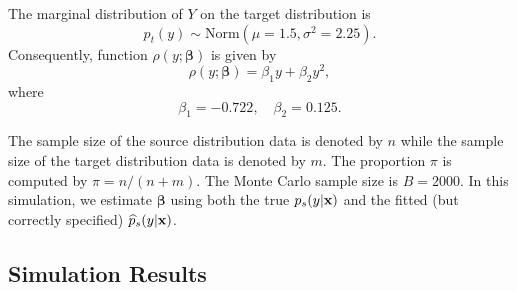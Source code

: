 \documentclass[12pt]{article}
\def\x{{\bf x}}
\def\bb{{\boldsymbol\beta}}
\begin{document}
The marginal distribution of $Y$ on the target distribution is
\[
p_t(y)\sim\mathrm{Norm}(\mu=1.5, \sigma^2=2.25).
\]
Consequently, function $\rho(y;\bb)$ is given by
\[
\rho(y;\bb)=\beta_1y+\beta_2y^2,
\]
where
\[
\beta_1=-0.722,\quad\beta_2=0.125.
\]

The sample size of the source distribution data is denoted by $n$ while the sample size of the target distribution data is denoted by $m$.
The proportion $\pi$ is computed by $\pi=n/(n+m)$.
The Monte Carlo sample size is $B=2000$.
In this simulation, we estimate $\bb$ using both the true $p_s(y|\x)$ and the fitted (but correctly specified) $\widehat p_s(y|\x)$.

\subsection*{Simulation Results}
\end{document}

